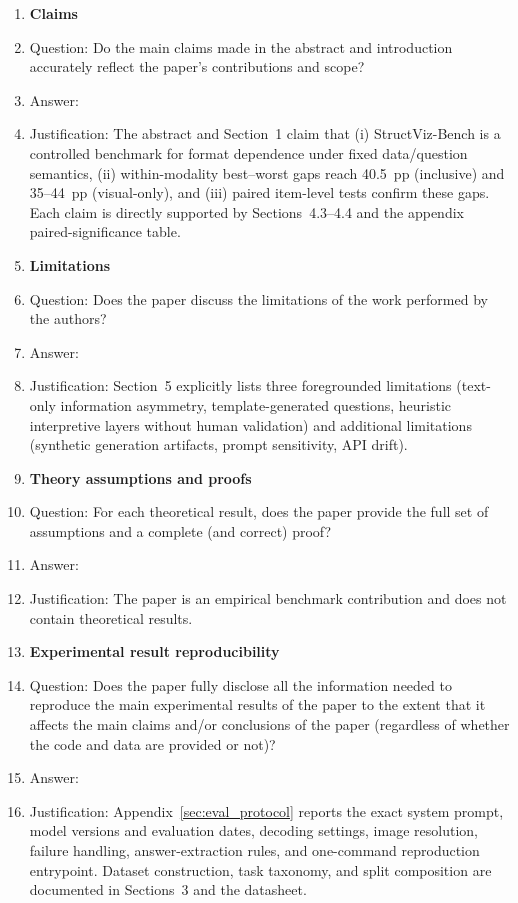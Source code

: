 \documentclass{article}
\begin{document}
\begin{enumerate}

\item {\bf Claims}
    \item[] Question: Do the main claims made in the abstract and introduction accurately reflect the paper's contributions and scope?
    \item[] Answer: \answerYes{}
    \item[] Justification: The abstract and Section~1 claim that (i) StructViz-Bench is a controlled benchmark for format dependence under fixed data/question semantics, (ii) within-modality best--worst gaps reach 40.5~pp (inclusive) and 35--44~pp (visual-only), and (iii) paired item-level tests confirm these gaps. Each claim is directly supported by Sections~4.3--4.4 and the appendix paired-significance table.

\item {\bf Limitations}
    \item[] Question: Does the paper discuss the limitations of the work performed by the authors?
    \item[] Answer: \answerYes{}
    \item[] Justification: Section~5 explicitly lists three foregrounded limitations (text-only information asymmetry, template-generated questions, heuristic interpretive layers without human validation) and additional limitations (synthetic generation artifacts, prompt sensitivity, API drift).

\item {\bf Theory assumptions and proofs}
    \item[] Question: For each theoretical result, does the paper provide the full set of assumptions and a complete (and correct) proof?
    \item[] Answer: \answerNA{}
    \item[] Justification: The paper is an empirical benchmark contribution and does not contain theoretical results.

\item {\bf Experimental result reproducibility}
    \item[] Question: Does the paper fully disclose all the information needed to reproduce the main experimental results of the paper to the extent that it affects the main claims and/or conclusions of the paper (regardless of whether the code and data are provided or not)?
    \item[] Answer: \answerYes{}
    \item[] Justification: Appendix~\ref{sec:eval_protocol} reports the exact system prompt, model versions and evaluation dates, decoding settings, image resolution, failure handling, answer-extraction rules, and one-command reproduction entrypoint. Dataset construction, task taxonomy, and split composition are documented in Sections~3 and the datasheet.


\end{enumerate}
\end{document}
